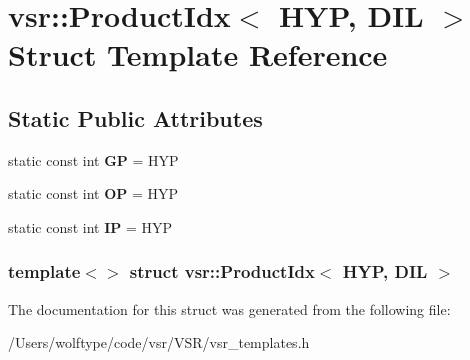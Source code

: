 \hypertarget{structvsr_1_1_product_idx_3_01_h_y_p_00_01_d_i_l_01_4}{\section{vsr\-:\-:Product\-Idx$<$ H\-Y\-P, D\-I\-L $>$ Struct Template Reference}
\label{structvsr_1_1_product_idx_3_01_h_y_p_00_01_d_i_l_01_4}
}
\subsection*{Static Public Attributes}
\begin{DoxyCompactItemize}
\item 
\hypertarget{structvsr_1_1_product_idx_3_01_h_y_p_00_01_d_i_l_01_4_a5b29998b400d5c3f57ee7f11444e842c}{static const int {\bfseries G\-P} = H\-Y\-P}\label{structvsr_1_1_product_idx_3_01_h_y_p_00_01_d_i_l_01_4_a5b29998b400d5c3f57ee7f11444e842c}

\item 
\hypertarget{structvsr_1_1_product_idx_3_01_h_y_p_00_01_d_i_l_01_4_af8fc70f3b2002c7bdc4db30214082c79}{static const int {\bfseries O\-P} = H\-Y\-P}\label{structvsr_1_1_product_idx_3_01_h_y_p_00_01_d_i_l_01_4_af8fc70f3b2002c7bdc4db30214082c79}

\item 
\hypertarget{structvsr_1_1_product_idx_3_01_h_y_p_00_01_d_i_l_01_4_a6a06987845da66cf16ddb658faa52016}{static const int {\bfseries I\-P} = H\-Y\-P}\label{structvsr_1_1_product_idx_3_01_h_y_p_00_01_d_i_l_01_4_a6a06987845da66cf16ddb658faa52016}

\end{DoxyCompactItemize}
\subsubsection*{template$<$$>$ struct vsr\-::\-Product\-Idx$<$ H\-Y\-P, D\-I\-L $>$}



The documentation for this struct was generated from the following file\-:\begin{DoxyCompactItemize}
\item 
/\-Users/wolftype/code/vsr/\-V\-S\-R/vsr\-\_\-templates.\-h\end{DoxyCompactItemize}
